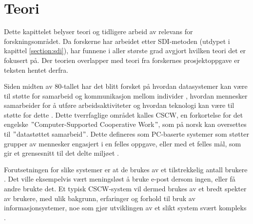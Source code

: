 \chapter{Teori}
\label{chp:teori} 
Dette kapittelet belyser teori og tidligere arbeid av relevans for forskningsområdet. Da forskerne har arbeidet etter SDI-metoden (utdypet i kapittel \ref{section:sdi}), har funnene i aller største grad avgjort hvilken teori det er fokusert på. Der teorien overlapper med teori fra forskernes prosjektoppgave \citep{Sund13} er teksten hentet derfra. 

\noindent
Siden midten av 80-tallet har det blitt forsket på hvordan datasystemer kan være til støtte for samarbeid og kommunikasjon mellom individer \citep{Rogers94}, hvordan mennesker samarbeider for å utføre arbeidsaktiviteter og hvordan teknologi kan være til støtte for dette \citep{Ellis91}. Dette tverrfaglige området kalles CSCW, en forkortelse for det engelske $"$Computer-Supported Cooperative Work$"$, som på norsk kan oversettes til $"$datastøttet samarbeid$"$. Dette defineres som PC-baserte systemer som støtter grupper av mennesker engasjert i en felles oppgave, eller med et felles mål, som gir et grensesnitt til det delte miljøet \citep{Ellis91}.

\noindent
Forutsetningen for slike systemer er at de brukes av et tilstrekkelig antall brukere \citep{Ackermann00}. Det ville eksempelvis vært meningsløst å bruke e-post dersom ingen, eller få andre brukte det. Et typisk CSCW-system vil dermed brukes av et bredt spekter av brukere, med ulik bakgrunn, erfaringer og forhold til bruk av informasjonsystemer, noe som gjør utviklingen av et slikt system svært kompleks \citep{Berg99}.
